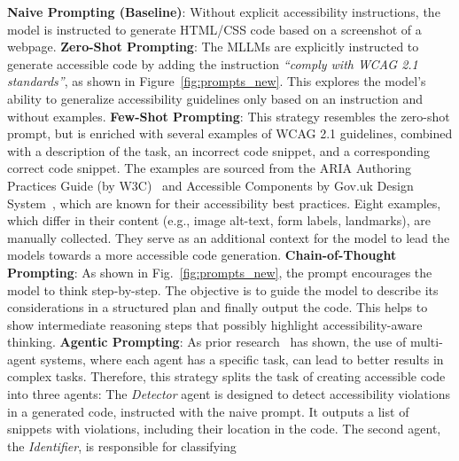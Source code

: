 \noindent
\textbf{Naive Prompting (Baseline)}: 
  Without explicit accessibility instructions, the model is
  instructed to generate HTML/CSS code based on a screenshot of a webpage.\newline\newline
\textbf{Zero-Shot Prompting}: 
  The MLLMs are explicitly instructed to 
  generate accessible code by adding the instruction \textit{``comply with WCAG 2.1 standards''}, 
  as shown in Figure~\ref{fig:prompts_new}. 
  This explores the model's ability to generalize accessibility guidelines 
  only based on an instruction and without examples.\newline\newline
\textbf{Few-Shot Prompting}: 
  This strategy resembles the zero-shot prompt,
  but is enriched with several examples of WCAG 2.1 guidelines, combined 
  with a description of the task, an incorrect code snippet, and a 
  corresponding correct code snippet.
  The examples are sourced from the ARIA Authoring Practices Guide 
  (by W3C)~\cite{web:w3c_examples} and Accessible Components by Gov.uk 
  Design System~\cite{web:govuk}, which are known for their accessibility
  best practices.
  Eight examples, which differ in their content (e.g., image alt-text, 
  form labels, landmarks), are manually collected. They serve as an 
  additional context for the model to lead the models towards a more 
  accessible code generation.\newline\newline
\textbf{Chain-of-Thought Prompting}: 
  As shown in Fig.~\ref{fig:prompts_new}, 
  the prompt encourages the model to think step-by-step. 
  The objective is to guide the model to describe its 
  considerations in a structured plan and finally output the code.
  This helps to show intermediate reasoning steps that possibly 
  highlight accessibility-aware thinking.\newline\newline
\textbf{Agentic Prompting}: 
  As prior research~\cite{wu2023autogen} has shown, the use of multi-agent 
  systems, where each agent has a specific task, can lead to better
  results in complex tasks. Therefore, this strategy splits the 
  task of creating accessible code into three agents: The 
  \textit{Detector} agent is designed to detect accessibility violations 
  in a generated code, instructed with the naive prompt. It outputs a list
  of snippets with violations, including their location in the code. The 
  second agent, the \textit{Identifier}, is responsible for classifying 
